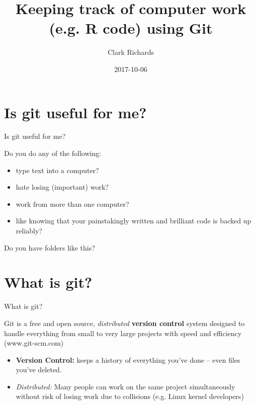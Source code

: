 \documentclass{beamer}
\title[Git MTM] %
{Keeping track of computer work (e.g. R code) using Git}
\subtitle
{}
\author
{Clark Richards}
\date%
{2017-10-06}
\begin{document}
\begin{frame}
  \titlepage
\end{frame}



\section{Is git useful for me?}

\begin{frame}{Is git useful for me?}

Do you do any of the following:
\begin{itemize}
\item<1-4> type text into a computer?
\item<2-4> hate losing (important) work?
\item<3> work from more than one computer?
\item<4> like knowing that your painstakingly written and brilliant
  code is backed up reliably?
\end{itemize}

\end{frame}

\begin{frame}

  Do you have folders like this?
  

\end{frame}

\section{What is git?}

\begin{frame}{What is git?}

  Git is a free and open source, {\it distributed} {\bf version
    control} system designed to handle everything from small to very
  large projects with speed and efficiency (www.git-scm.com)
  \vspace{2em}
  \begin{itemize}
  \item {\bf Version Control:} keeps a history of everything you've
    done -- even files you've deleted.
  \item {\it Distributed:} Many people can work on the same project
    simultaneously without risk of losing work due to collisions
    (e.g. Linux kernel developers)
  \end{itemize}
\end{frame}
\end{document}
